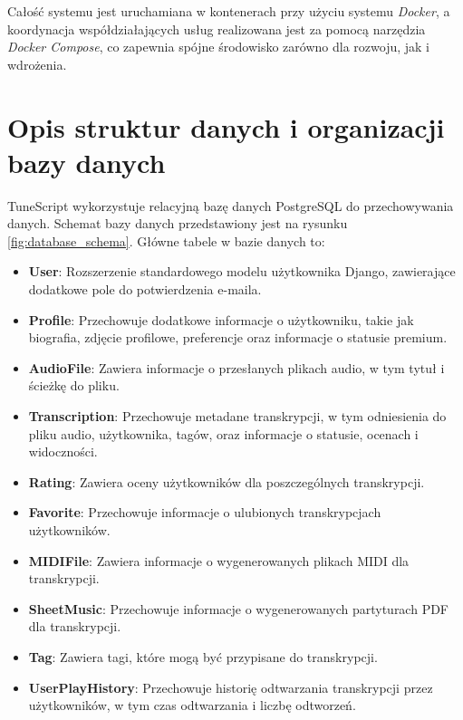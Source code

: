 \documentclass[a4paper,twoside,12pt]{book}
\begin{document}
Całość systemu jest uruchamiana w kontenerach przy użyciu systemu \textit{Docker}, a koordynacja współdziałających usług realizowana jest za pomocą narzędzia \textit{Docker Compose}, co zapewnia spójne środowisko zarówno dla rozwoju, jak i wdrożenia.

\section{Opis struktur danych i organizacji bazy danych}

TuneScript wykorzystuje relacyjną bazę danych PostgreSQL do przechowywania danych. Schemat bazy danych przedstawiony jest na rysunku \ref{fig:database_schema}. Główne tabele w bazie danych to:

\begin{itemize}
	\item \textbf{User}: Rozszerzenie standardowego modelu użytkownika Django, zawierające dodatkowe pole do potwierdzenia e-maila.
	          
	\item \textbf{Profile}: Przechowuje dodatkowe informacje o użytkowniku, takie jak biografia, zdjęcie profilowe, preferencje oraz informacje o statusie premium.
	          
	\item \textbf{AudioFile}: Zawiera informacje o przesłanych plikach audio, w tym tytuł i ścieżkę do pliku.
	          
	\item \textbf{Transcription}: Przechowuje metadane transkrypcji, w tym odniesienia do pliku audio, użytkownika, tagów, oraz informacje o statusie, ocenach i widoczności.
	          
	\item \textbf{Rating}: Zawiera oceny użytkowników dla poszczególnych transkrypcji.
	          
	\item \textbf{Favorite}: Przechowuje informacje o ulubionych transkrypcjach użytkowników.
	          
	\item \textbf{MIDIFile}: Zawiera informacje o wygenerowanych plikach MIDI dla transkrypcji.
	          
	\item \textbf{SheetMusic}: Przechowuje informacje o wygenerowanych partyturach PDF dla transkrypcji.
	          
	\item \textbf{Tag}: Zawiera tagi, które mogą być przypisane do transkrypcji.
	          
	\item \textbf{UserPlayHistory}: Przechowuje historię odtwarzania transkrypcji przez użytkowników, w tym czas odtwarzania i liczbę odtworzeń.
\end{itemize}
\end{document}
